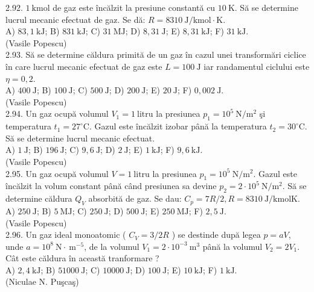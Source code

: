 2.92. $1 \mathrm{~kmol}$ de gaz este încălzit la presiune constantă cu $10 \mathrm{~K}$. Să se determine lucrul mecanic efectuat de gaz. Se dă: $R=8310 \mathrm{~J} / \mathrm{kmol} \cdot \mathrm{K}$.\\ A) $83,1 \mathrm{~kJ}$; B) $831 \mathrm{~kJ}$; C) $31 \mathrm{~MJ}$; D) $8,31 \mathrm{~J}$; E) $8,31 \mathrm{~kJ}$; F) $31 \mathrm{~kJ}$.\\ (Vasile Popescu)\\

2.93. Să se determine căldura primită de un gaz în cazul unei transformări ciclice în care lucrul mecanic efectuat de gaz este $L=100 \mathrm{~J}$ iar randamentul ciclului este $\eta=0,2$.\\ A) $400 \mathrm{~J}$; B) $100 \mathrm{~J}$; C) $500 \mathrm{~J}$; D) $200 \mathrm{~J}$; E) $20 \mathrm{~J}$; F) $0,002 \mathrm{~J}$.\\ (Vasile Popescu)\\

2.94. Un gaz ocupă volumul $V_{1}=1 \mathrm{~litru}$ la presiunea $p_{1}=10^{5} \mathrm{~N} / \mathrm{m}^{2}$ şi temperatura $t_{1}=27^{\circ} \mathrm{C}$. Gazul este încălzit izobar până la temperatura $t_{2}=30^{\circ} \mathrm{C}$. Să se determine lucrul mecanic efectuat.\\ A) $1 \mathrm{~J}$; B) $196 \mathrm{~J}$; C) $9,6 \mathrm{~J}$; D) $2 \mathrm{~J}$; E) $1 \mathrm{~kJ}$; F) $9,6 \mathrm{~kJ}$.\\ (Vasile Popescu)\\

2.95. Un gaz ocupă volumul $V=1 \mathrm{~litru}$ la presiunea $p_{1}=10^{5} \mathrm{~N} / \mathrm{m}^{2}$. Gazul este încălzit la volum constant până când presiunea sa devine $p_{2}=2 \cdot 10^{5} \mathrm{~N} / \mathrm{m}^{2}$. Să se determine căldura $Q_{V}$ absorbită de gaz. Se dau: $C_{p}=7 R / 2, R=8310 \mathrm{~J} / \mathrm{kmol} \mathrm{K}$.\\ A) $250 \mathrm{~J}$; B) $5 \mathrm{~MJ}$; C) $250 \mathrm{~J}$; D) $500 \mathrm{~J}$; E) $250 \mathrm{~MJ}$; F) $2,5 \mathrm{~J}$.\\ (Vasile Popescu)\\

2.96. Un gaz ideal monoatomic ( $C_{V}=3 / 2 R$ ) se destinde după legea $p=a V$, unde $a=10^{8} \mathrm{~N} \cdot \mathrm{~m}^{-5}$, de la volumul $V_{1}=2 \cdot 10^{-3} \mathrm{~m}^{3}$ până la volumul $V_{2}=2 V_{1}$. Cât este căldura în această tranformare ?\\ A) $2,4 \mathrm{~kJ}$; B) $51000 \mathrm{~J}$; C) $10000 \mathrm{~J}$; D) $100 \mathrm{~J}$; E) $10 \mathrm{~kJ}$; F) $1 \mathrm{~kJ}$.\\ (Niculae N. Puşcaş)\\

